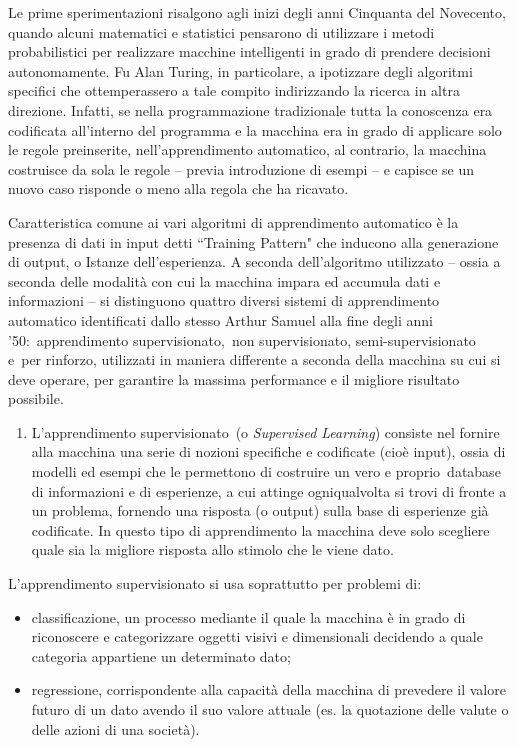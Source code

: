 \documentclass[
  b5paper,
  twoside,
  12pt,
  chapterprefix=false,
  bibliography=totocnumbered,
  parskip=false]{scrbook}
\providecommand{\tightlist}{%
  \setlength{\itemsep}{0pt}\setlength{\parskip}{0pt}}
\begin{document}
Le prime sperimentazioni risalgono agli inizi degli anni Cinquanta del
Novecento, quando alcuni matematici e statistici pensarono di utilizzare
i metodi probabilistici per realizzare macchine intelligenti in grado di
prendere decisioni autonomamente. Fu Alan Turing, in particolare, a
ipotizzare degli algoritmi specifici che ottemperassero a tale compito
indirizzando la ricerca in altra direzione. Infatti, se nella
programmazione tradizionale tutta la conoscenza era codificata
all'interno del programma e la macchina era in grado di applicare solo
le regole preinserite, nell'apprendimento automatico, al contrario, la
macchina costruisce da sola le regole -- previa introduzione di esempi
-- e capisce se un nuovo caso risponde o meno alla regola che ha
ricavato.

Caratteristica comune ai vari algoritmi di apprendimento automatico è la
presenza di dati in input detti ``Training Pattern" che inducono alla
generazione di output, o Istanze dell'esperienza. A seconda
dell'algoritmo utilizzato -- ossia a seconda delle modalità con cui la
macchina impara ed accumula dati e informazioni -- si distinguono
quattro diversi sistemi di apprendimento automatico identificati dallo
stesso Arthur Samuel alla fine degli anni '50:~apprendimento
supervisionato,~non supervisionato, semi-supervisionato e~per rinforzo,
utilizzati in maniera differente a seconda della macchina su cui si deve
operare, per garantire la massima performance e il migliore risultato
possibile.

\begin{enumerate}
\def\labelenumi{\arabic{enumi}.}
\tightlist
\item
  L'apprendimento supervisionato~(o \emph{Supervised Learning}) consiste
  nel fornire alla macchina una serie di nozioni specifiche e
  codificate (cioè input), ossia di modelli ed esempi che le
  permettono di costruire un vero e proprio~database di informazioni e
  di esperienze, a cui attinge ogniqualvolta si trovi di fronte a un
  problema, fornendo una risposta (o output) sulla base di esperienze
  già codificate. In questo tipo di apprendimento la macchina deve
  solo scegliere quale sia la migliore risposta allo stimolo che le
  viene dato.
\end{enumerate}

L'apprendimento supervisionato si usa soprattutto per problemi di:

\begin{itemize}
\item
  classificazione, un processo mediante il quale la macchina è in
  grado di riconoscere e categorizzare oggetti visivi e dimensionali
  decidendo a quale categoria appartiene un determinato dato;
\item
  regressione, corrispondente alla capacità della macchina di
  prevedere il valore futuro di un dato avendo il suo valore attuale
  (es. la quotazione delle valute o delle azioni di una società).
\end{itemize}
\end{document}

